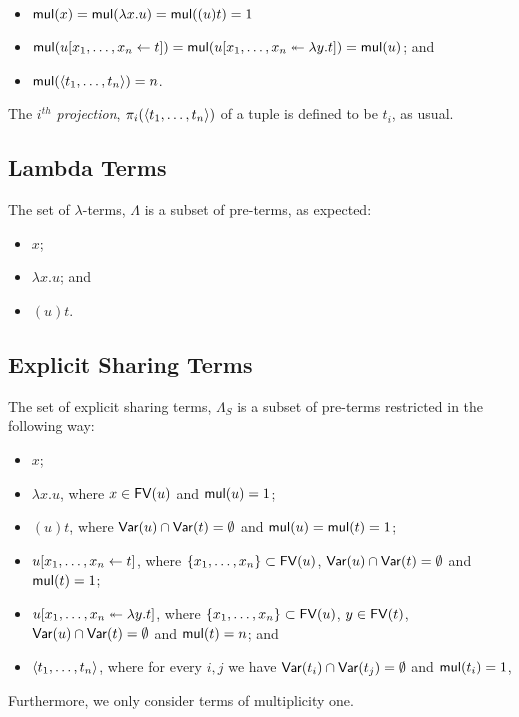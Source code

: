 \documentclass[11pt,a4paper]{article}
\theoremstyle{definition}
\theoremstyle{plain}
\theoremstyle{remark}
\begin{document}
\begin{itemize}
	\item ${\mathop{\mathsf{mul}}}(x)={\mathop{\mathsf{mul}}}(\lambda x.u)={\mathop{\mathsf{mul}}}((u)t)=1$
	\item ${\mathop{\mathsf{mul}}}({{{u}[{{x_1},\dots,{x_n}}\leftarrow{t}]}})={\mathop{\mathsf{mul}}}({{u}[{x_1},\dots,{x_n}\twoheadleftarrow{\lambda{y}.{t}}]})={\mathop{\mathsf{mul}}}(u)$; and
	\item ${\mathop{\mathsf{mul}}}({\langle{t_1},\dots,{t_n}{\rangle}})=n$.
\end{itemize}

\newcommand{\terpr}[2]{{\pi_{#1}({#2})}}

The \emph{$i^{th}$ projection}, $\terpr{i}{\tertuple{t_1}{t_n}}$ of a tuple is defined to be $t_i$, as usual.

\subsection{Lambda Terms}

The set of $\lambda$-terms, $\Lambda$ is a subset of pre-terms, as expected:

\begin{itemize}
	\item $x$;
	\item $\lambda x.u$; and
	\item $(u)t$.
\end{itemize}

\subsection{Explicit Sharing Terms}

The set of explicit sharing terms, $\Lambda_S$ is a subset of pre-terms restricted in the following way:

\begin{itemize}
	\item $x$;
	\item $\lambda x.u$, where $x\in{\mathop{\mathsf{FV}}}(u)$ and ${\mathop{\mathsf{mul}}}(u)=1$;
	\item $(u)t$, where ${\mathop{\mathsf{Var}}}(u)\cap{\mathop{\mathsf{Var}}}(t)=\emptyset$ and ${\mathop{\mathsf{mul}}}(u)={\mathop{\mathsf{mul}}}(t)=1$;
	\item ${{{u}[{{x_1},\dots,{x_n}}\leftarrow{t}]}}$, where $\{x_1,\dots,x_n\}\subset{\mathop{\mathsf{FV}}}(u)$, ${\mathop{\mathsf{Var}}}(u)\cap{\mathop{\mathsf{Var}}}(t)=\emptyset$ and ${\mathop{\mathsf{mul}}}(t)=1$;
	\item ${{u}[{x_1},\dots,{x_n}\twoheadleftarrow{\lambda{y}.{t}}]}$, where $\{x_1,\dots,x_n\}\subset{\mathop{\mathsf{FV}}}(u)$, $y\in{\mathop{\mathsf{FV}}}(t)$, ${\mathop{\mathsf{Var}}}(u)\cap{\mathop{\mathsf{Var}}}(t)=\emptyset$ and ${\mathop{\mathsf{mul}}}(t)=n$; and
	\item ${\langle{t_1},\dots,{t_n}{\rangle}}$, where for every $i,j$ we have ${\mathop{\mathsf{Var}}}(t_i)\cap{\mathop{\mathsf{Var}}}(t_j)=\emptyset$ and ${\mathop{\mathsf{mul}}}(t_i)=1$,
\end{itemize}
Furthermore, we only consider terms of multiplicity one.
\end{document}
